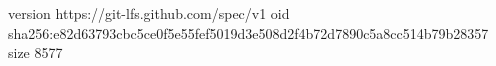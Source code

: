 version https://git-lfs.github.com/spec/v1
oid sha256:e82d63793cbc5ce0f5e55fef5019d3e508d2f4b72d7890c5a8cc514b79b28357
size 8577
